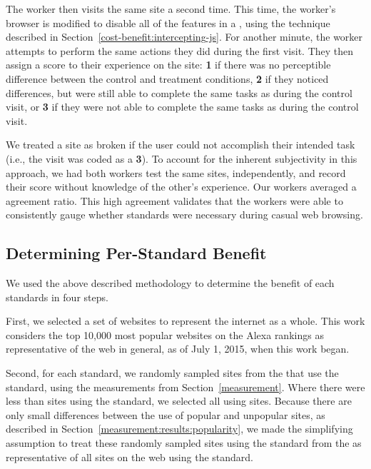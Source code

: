 The worker then visits the same site a second time.  This time, the worker's
browser is modified to disable all of the features in a \WAS, using the
technique described in Section~\ref{cost-benefit:intercepting-js}.  For another
minute, the worker attempts to perform the same actions they did during the
first visit. They then assign a score to their experience on the site:
\textbf{1} if there was no perceptible difference between the control and
treatment conditions, \textbf{2} if they noticed differences, but
were still able to complete the same tasks as during the control visit,
or \textbf{3} if they were not able to complete the same tasks as during
the control visit.

We treated a site as broken if the user could not accomplish their intended
task (i.e., the visit was coded as a \textbf{3}).  To account for the inherent
subjectivity in this approach, we had both workers test the same sites,
independently, and record their score without knowledge of the other's
experience. Our workers averaged a \PctAgreementOnStandardTests agreement
ratio. This high agreement validates that the workers were able
to consistently gauge whether \WAPI standards were necessary during
casual web browsing.


\subsection{Determining Per-Standard Benefit}
\label{cost-benefit:methodology:per-standard-benefit}
We used the above described methodology to determine the benefit of each \WAPI
standards in four steps.

First, we selected a set of websites to represent the internet as a whole.
This work considers the top 10,000 most popular websites on the Alexa rankings
as representative of the web in general, as of July 1, 2015, when this work
began.

Second, for each standard, we randomly sampled \NumSitesPerStandard sites from
the \ATK that use the standard, using the measurements from
Section~\ref{measurement}.  Where there were less than \NumSitesPerStandard
sites using the standard, we selected all using sites.  Because there are only
small differences between the \WAPI use of popular and unpopular sites, as
described in Section~\ref{measurement:results:popularity}, we made the
simplifying assumption to treat these randomly sampled \NumSitesPerStandard
sites using the standard from the \ATK as representative of all sites on the
web using the standard.

